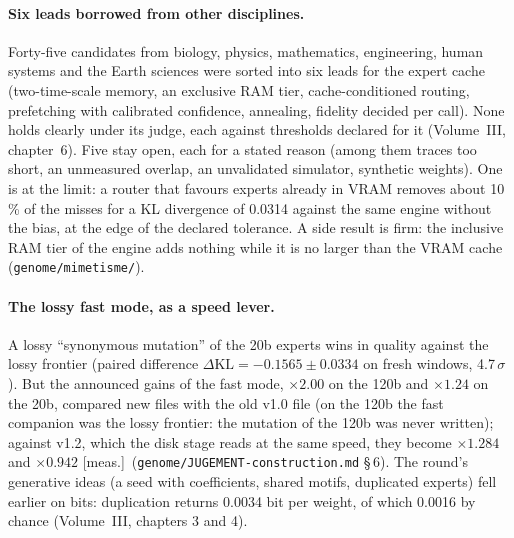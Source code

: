 \documentclass[11pt, a4paper]{article}
\theoremstyle{remark}
\newcommand{\etiq}[1]{\textsf{\scriptsize[#1]}}
\newcommand{\mes}{\etiq{meas.}}
\newcommand{\fichier}[1]{\textsf{\footnotesize\nolinkurl{#1}}}
\begin{document}
\paragraph{Six leads borrowed from other disciplines.} Forty-five candidates from biology, physics, mathematics, engineering, human systems and the Earth sciences were sorted into six leads for the expert cache (two-time-scale memory, an exclusive RAM tier, cache-conditioned routing, prefetching with calibrated confidence, annealing, fidelity decided per call). None holds clearly under its judge, each against thresholds declared for it (Volume~III, chapter~6). Five stay open, each for a stated reason (among them traces too short, an unmeasured overlap, an unvalidated simulator, synthetic weights). One is at the limit: a router that favours experts already in VRAM removes about 10\,\% of the misses for a KL divergence of 0.0314 against the same engine without the bias, at the edge of the declared tolerance. A side result is firm: the inclusive RAM tier of the engine adds nothing while it is no larger than the VRAM cache (\fichier{genome/mimetisme/}).

\paragraph{The lossy fast mode, as a speed lever.} A lossy ``synonymous mutation'' of the 20b experts wins in quality against the lossy frontier (paired difference $\Delta\mathrm{KL} = -0.1565 \pm 0.0334$ on fresh windows, 4.7\,$\sigma$). But the announced gains of the fast mode, $\times 2.00$ on the 120b and $\times 1.24$ on the 20b, compared new files with the old v1.0 file (on the 120b the fast companion was the lossy frontier: the mutation of the 120b was never written); against v1.2, which the disk stage reads at the same speed, they become $\times 1.284$ and $\times 0.942$ \mes~(\fichier{genome/JUGEMENT-construction.md} §\,6). The round's generative ideas (a seed with coefficients, shared motifs, duplicated experts) fell earlier on bits: duplication returns 0.0034 bit per weight, of which 0.0016 by chance (Volume~III, chapters 3 and 4).
\end{document}
